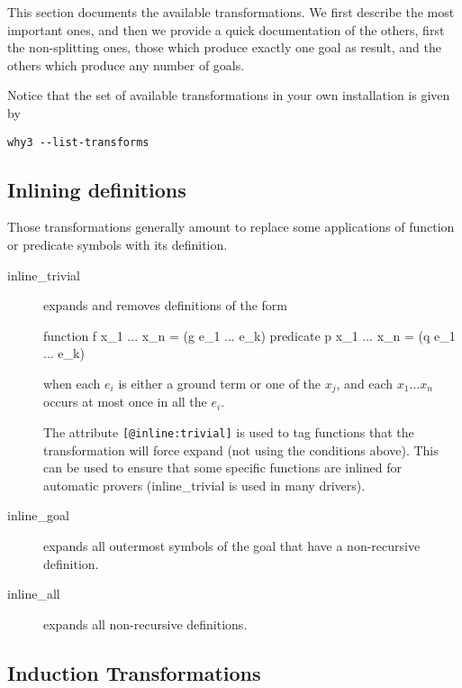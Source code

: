 This section documents the available transformations. We first
describe the most important ones, and then we provide a quick
documentation of the others, first the non-splitting ones, \eg those
which produce exactly one goal as result, and the others which produce any
number of goals.

Notice that the set of available transformations in your own
installation is given by
\begin{verbatim}
why3 --list-transforms
\end{verbatim}

\subsection{Inlining definitions}

Those transformations generally amount to replace some applications of
function or predicate symbols with its definition.

\begin{description}

\item[inline\_trivial]
  expands and removes definitions of the form
\begin{whycode}
function  f x_1 ... x_n = (g e_1 ... e_k)
predicate p x_1 ... x_n = (q e_1 ... e_k)
\end{whycode}
when each $e_i$ is either a ground term or one of the $x_j$, and
each $x_1 \dots x_n$ occurs at most once in all the $e_i$.

The attribute \texttt{[@inline:trivial]} is used to tag functions that
the transformation will force expand (not using the conditions above). This can
be used to ensure that some specific functions are inlined for automatic
provers (inline\_trivial is used in many drivers).


\item[inline\_goal] expands all outermost symbols of the goal that
  have a non-recursive definition.

\item[inline\_all]
  expands all non-recursive definitions.

\end{description}


\subsection{Induction Transformations}

